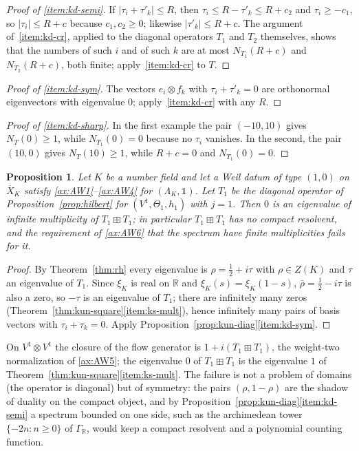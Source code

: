 \documentclass[11pt]{amsart}
\theoremstyle{plain}
\newtheorem{proposition}[theorem]{Proposition}
\theoremstyle{definition}
\theoremstyle{remark}
\numberwithin{equation}{section}
\newcommand{\R}{\mathbb{R}}
\newcommand{\Xbar}{\overline{X}}
\newcommand{\GR}{\Gamma_{\mathbb{R}}}
\begin{document}
\begin{proof}[Proof of \ref{item:kd-semi}]
If $|\tau_i+\tau'_k|\le R$, then $\tau_i\le R-\tau'_k\le R+c_2$ and
$\tau_i\ge-c_1$, so $|\tau_i|\le R+c$ because $c_1,c_2\ge0$; likewise
$|\tau'_k|\le R+c$. The argument of~\ref{item:kd-cr}, applied to the
diagonal operators $T_1$ and $T_2$ themselves, shows that the numbers of
such $i$ and of such $k$ are at most $N_{T_1}(R+c)$ and $N_{T_2}(R+c)$,
both finite; apply~\ref{item:kd-cr} to $T$.
\end{proof}

\begin{proof}[Proof of \ref{item:kd-sym}]
The vectors $e_i\otimes f_k$ with $\tau_i+\tau'_k=0$ are orthonormal
eigenvectors with eigenvalue $0$; apply~\ref{item:kd-cr} with any $R$.
\end{proof}

\begin{proof}[Proof of \ref{item:kd-sharp}]
In the first example the pair $(-10,10)$ gives $N_T(0)\ge1$, while
$N_{T_1}(0)=0$ because no $\tau_i$ vanishes. In the second, the pair
$(10,0)$ gives $N_T(10)\ge1$, while $R+c=0$ and $N_{T_1}(0)=0$.
\end{proof}

\begin{proposition}\label{prop:kun-AW6}
Let $K$ be a number field and let a Weil datum of type $(1,0)$ on
$\Xbar_K$ satisfy \ref{ax:AW1}--\ref{ax:AW4} for $(\Lambda_K,\mathbb
1)$. Let $T_1$ be the diagonal operator of Proposition~\ref{prop:hilbert}
for $(V^1,\Theta_1,h_1)$ with $j=1$. Then $0$ is an eigenvalue of
infinite multiplicity of $T_1\boxplus T_1$; in particular
$T_1\boxplus T_1$ has no compact resolvent, and the requirement of
\ref{ax:AW6} that the spectrum have finite multiplicities fails for it.
\end{proposition}

\begin{proof}
By Theorem~\ref{thm:rh} every eigenvalue is
$\rho=\tfrac12+i\tau$ with $\rho\in Z(K)$ and $\tau$ an eigenvalue of
$T_1$. Since $\xi_K$ is real on $\R$ and $\xi_K(s)=\xi_K(1-s)$,
$\bar\rho=\tfrac12-i\tau$ is also a zero, so $-\tau$ is an eigenvalue of
$T_1$; there are infinitely many zeros
(Theorem~\ref{thm:kun-square}\ref{item:ks-mult}), hence infinitely many
pairs of basis vectors with $\tau_i+\tau_k=0$. Apply
Proposition~\ref{prop:kun-diag}\ref{item:kd-sym}.
\end{proof}

On $V^1\otimes V^1$ the closure of the flow generator is
$1+i(T_1\boxplus T_1)$, the weight-two normalization of \ref{ax:AW5};
the eigenvalue $0$ of $T_1\boxplus T_1$ is the eigenvalue $1$ of
Theorem~\ref{thm:kun-square}\ref{item:ks-mult}. The failure is not a
problem of domains (the operator is diagonal) but of symmetry: the pairs
$(\rho,1-\rho)$ are the shadow of duality on the compact object, and by
Proposition~\ref{prop:kun-diag}\ref{item:kd-semi} a spectrum bounded on
one side, such as the archimedean tower $\{-2n:n\ge0\}$ of
$\GR$, would keep a compact resolvent and a polynomial counting function.
\end{document}
